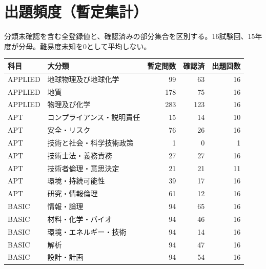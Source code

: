 \chapter{出題頻度（暫定集計）}
分類未確認を含む全登録値と、確認済みの部分集合を区別する。16試験回、15年度が分母。難易度未知を0として平均しない。
\begin{longtable}{p{.16\linewidth}p{.42\linewidth}rrr}
科目 & 大分類 & 暫定問数 & 確認済 & 出題回数\\\hline
APPLIED & 地球物理及び地球化学 & 99 & 63 & 16\\
APPLIED & 地質 & 178 & 75 & 16\\
APPLIED & 物理及び化学 & 283 & 123 & 16\\
APT & コンプライアンス・説明責任 & 15 & 14 & 10\\
APT & 安全・リスク & 76 & 26 & 16\\
APT & 技術と社会・科学技術政策 & 1 & 0 & 1\\
APT & 技術士法・義務責務 & 27 & 27 & 16\\
APT & 技術者倫理・意思決定 & 21 & 21 & 11\\
APT & 環境・持続可能性 & 39 & 17 & 16\\
APT & 研究・情報倫理 & 61 & 12 & 16\\
BASIC & 情報・論理 & 94 & 65 & 16\\
BASIC & 材料・化学・バイオ & 94 & 46 & 16\\
BASIC & 環境・エネルギー・技術 & 94 & 14 & 16\\
BASIC & 解析 & 94 & 47 & 16\\
BASIC & 設計・計画 & 94 & 54 & 16\\
\end{longtable}
